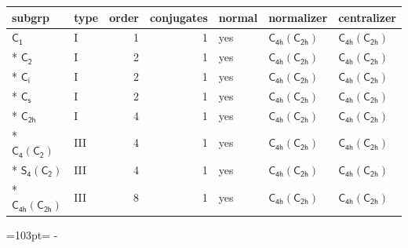 \documentclass[10pt,a4paper]{article}
\newcommand{\needspace}[1]{\par\penalty-100\begingroup\dimen0=#1\relax\dimen2=\pagegoal
  \advance\dimen2-\pagetotal\ifdim\dimen0>\dimen2\relax\ifdim\dimen2>0pt\vfil\break\fi\fi
  \endgroup}
\numberwithin{equation}{section}
\newcommand{\grp}[1]{\mathsf{#1}}
\begin{document}
{\small\begin{longtable}{@{}llrrlll@{}}\toprule
subgrp & type & order & conjugates & normal & normalizer & centralizer\\\midrule\endhead
\bottomrule\endfoot\endlastfoot
\href{../../../rotation/data/pdf/C1.pdf}{$\grp{C_{1}}$} & I & 1 & 1 & yes & \href{C4h-C2h.pdf}{$\grp{C_{4h}}(\grp{C_{2h}})$} & \href{C4h-C2h.pdf}{$\grp{C_{4h}}(\grp{C_{2h}})$}\\*
\href{../../../rotation/data/pdf/C2.pdf}{$\grp{C_{2}}$} & I & 2 & 1 & yes & \href{C4h-C2h.pdf}{$\grp{C_{4h}}(\grp{C_{2h}})$} & \href{C4h-C2h.pdf}{$\grp{C_{4h}}(\grp{C_{2h}})$}\\*
\href{../../../rotation/data/pdf/S2.pdf}{$\grp{C_{i}}$} & I & 2 & 1 & yes & \href{C4h-C2h.pdf}{$\grp{C_{4h}}(\grp{C_{2h}})$} & \href{C4h-C2h.pdf}{$\grp{C_{4h}}(\grp{C_{2h}})$}\\*
\href{../../../rotation/data/pdf/C1v.pdf}{$\grp{C_{s}}$} & I & 2 & 1 & yes & \href{C4h-C2h.pdf}{$\grp{C_{4h}}(\grp{C_{2h}})$} & \href{C4h-C2h.pdf}{$\grp{C_{4h}}(\grp{C_{2h}})$}\\*
\href{../../../rotation/data/pdf/C2h.pdf}{$\grp{C_{2h}}$} & I & 4 & 1 & yes & \href{C4h-C2h.pdf}{$\grp{C_{4h}}(\grp{C_{2h}})$} & \href{C4h-C2h.pdf}{$\grp{C_{4h}}(\grp{C_{2h}})$}\\*
\href{C4-C2.pdf}{$\grp{C_{4}}(\grp{C_{2}})$} & III & 4 & 1 & yes & \href{C4h-C2h.pdf}{$\grp{C_{4h}}(\grp{C_{2h}})$} & \href{C4h-C2h.pdf}{$\grp{C_{4h}}(\grp{C_{2h}})$}\\*
\href{S4-C2.pdf}{$\grp{S_{4}}(\grp{C_{2}})$} & III & 4 & 1 & yes & \href{C4h-C2h.pdf}{$\grp{C_{4h}}(\grp{C_{2h}})$} & \href{C4h-C2h.pdf}{$\grp{C_{4h}}(\grp{C_{2h}})$}\\*
\href{C4h-C2h.pdf}{$\grp{C_{4h}}(\grp{C_{2h}})$} & III & 8 & 1 & yes & \href{C4h-C2h.pdf}{$\grp{C_{4h}}(\grp{C_{2h}})$} & \href{C4h-C2h.pdf}{$\grp{C_{4h}}(\grp{C_{2h}})$}\\
\bottomrule\end{longtable}}
\needspace{103pt}
\end{document}

